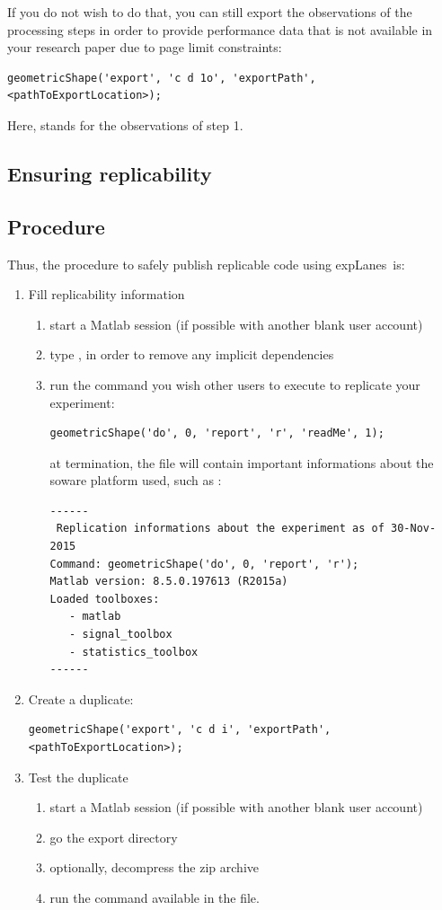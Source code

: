 \documentclass[a4paper,fleqn]{tufte-handout}
\newcommand{\explanes}{\textsf{expLanes}\ }
\begin{document}
If you do not wish to do that, you can still export the observations of the processing steps in order to provide performance data that is not available in your research paper due to page limit constraints:
\begin{lstlisting}
geometricShape('export', 'c d 1o', 'exportPath', <pathToExportLocation>);
\end{lstlisting} 
Here,  stands for the observations of step 1.

\subsection{Ensuring replicability}

\subsection{Procedure}

Thus, the procedure to safely publish replicable code using \explanes is:
\begin{enumerate}
\item Fill replicability information
\begin{enumerate}
\item start a Matlab session (if possible with another blank user account)
\item type , in order to remove any implicit dependencies
\item run the command you wish other users to execute to replicate your experiment:
\begin{lstlisting}
geometricShape('do', 0, 'report', 'r', 'readMe', 1);
\end{lstlisting}
at termination, the file  will contain important informations about the soware platform used, such as :
\begin{lstlisting}
------
 Replication informations about the experiment as of 30-Nov-2015
Command: geometricShape('do', 0, 'report', 'r');
Matlab version: 8.5.0.197613 (R2015a)
Loaded toolboxes:
   - matlab
   - signal_toolbox
   - statistics_toolbox
------
\end{lstlisting}

\end{enumerate}
\item Create a duplicate:
\begin{lstlisting}
geometricShape('export', 'c d i', 'exportPath', <pathToExportLocation>);
\end{lstlisting}
\item Test the duplicate
\begin{enumerate}
\item start a Matlab session (if possible with another blank user account)
\item go the export directory
\item optionally, decompress the zip archive
\item run the command available in the  file.
\end{enumerate}
\end{enumerate}
\end{document}

